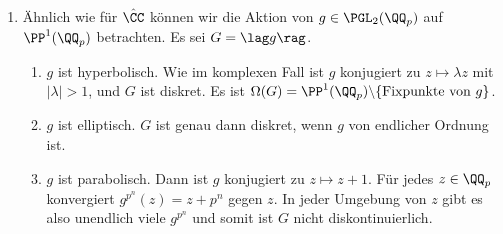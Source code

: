 \begin{enumerate}
\item Ähnlich wie für $\hat{\CC}$ können wir die Aktion von
$g\in\PGL_2(\QQ_p)$ auf $\PP^1(\QQ_p)$ betrachten.
Es sei $G=\lag g\rag$.
\begin{enumerate}
\item $g$ ist hyperbolisch. Wie im komplexen Fall ist $g$ konjugiert
zu $z\mapsto\lambda z$ mit $|\lambda|>1$, und $G$ ist diskret.
Es ist $\Omega(G)=\PP^1(\QQ_p)\backslash\{\text{Fixpunkte von }g\}$.
\item $g$ ist elliptisch. $G$ ist genau dann diskret, wenn
$g$ von endlicher Ordnung ist.
\item $g$ ist parabolisch. Dann ist $g$ konjugiert zu $z\mapsto z+1$.
Für jedes $z\in\QQ_p$ konvergiert $g^{p^n}(z)=z+p^n$ gegen $z$.
In jeder Umgebung von $z$ gibt es also unendlich viele $g^{p^n}$
und somit ist $G$ nicht diskontinuierlich.
\end{enumerate}
\end{enumerate}

